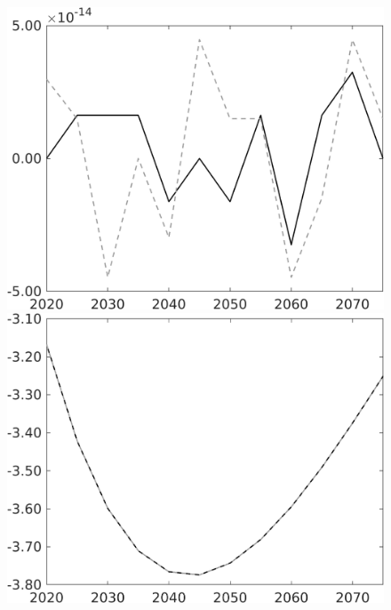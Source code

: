 \documentclass[12pt]{article}
\begin{document}
\begin{figure}[h!!]
\begin{minipage}[]{0.32\textwidth}
	\end{minipage}	
	\begin{minipage}[]{0.32\textwidth}
		\includegraphics[width=1\textwidth]{../../codding_model/own_basedOnFried/optimalPol_010922_revision/figures/all_13Sept22/PerdifNoTauf_Equlab_regime0_CompTaul_hh_spillover0_nsk1_xgr0_knspil1_sep1_LFlimit0_emsbase0_countec0_GovRev0_etaa0.79_lgd0.png}
	\end{minipage}	
	\begin{minipage}[]{0.32\textwidth}
		\includegraphics[width=1\textwidth]{../../codding_model/own_basedOnFried/optimalPol_010922_revision/figures/all_13Sept22/PerdifNoTauf_Equlab_regime0_CompTaul_C_spillover0_nsk1_xgr0_knspil1_sep1_LFlimit0_emsbase0_countec0_GovRev0_etaa0.79_lgd0.png}

\end{minipage}
\end{figure}
\end{document}
